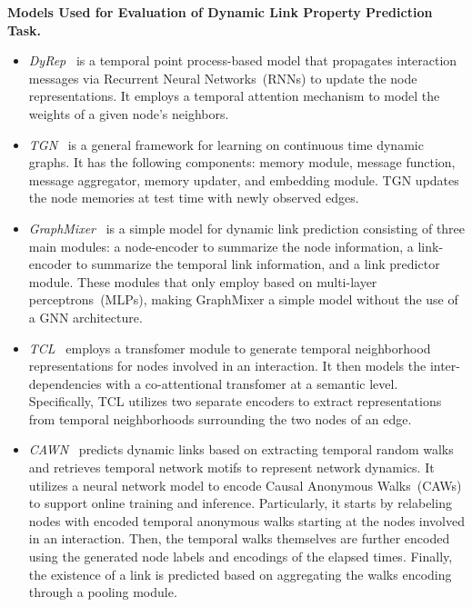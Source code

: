 \textbf{Models Used for Evaluation of Dynamic Link Property Prediction Task.}
\begin{itemize}[leftmargin=*]
    \item \emph{DyRep}~\cite{trivedi2019dyrep} is a temporal point process-based model that propagates interaction messages via Recurrent Neural Networks~(RNNs) to update the node representations. It employs a temporal attention mechanism to model the weights of a given node's neighbors. 
    
    \item \emph{TGN}~\cite{rossi2020temporal} is a general framework for learning on continuous time dynamic graphs. It has the following components: memory module, message function, message aggregator, memory updater, and embedding module. TGN updates the node memories at test time with newly observed edges. 
    
    \item \emph{GraphMixer}~\cite{congwe} is a simple model for dynamic link prediction consisting of three main modules: a node-encoder to summarize the node information, a link-encoder to summarize the temporal link information, and a link predictor module. These modules that only employ based on multi-layer perceptrons~(MLPs), making GraphMixer a simple model without the use of a GNN architecture.
    
    \item \emph{TCL}~\cite{wang2021tcl} employs a transfomer module to generate temporal neighborhood representations for nodes involved in an interaction. 
    It then models the inter-dependencies with a co-attentional transfomer at a semantic level. Specifically, TCL utilizes two separate encoders to extract representations from temporal neighborhoods surrounding the two nodes of an edge.
    
    \item \emph{CAWN}~\cite{wanginductive} predicts dynamic links based on extracting temporal random walks and retrieves temporal network motifs to represent network dynamics. It utilizes a neural network model to encode Causal Anonymous Walks~(CAWs) to support online training and inference.
    Particularly, it starts by relabeling nodes with encoded temporal anonymous walks starting at the nodes involved in an interaction.
    Then, the temporal walks themselves are further encoded using the generated node labels and encodings of the elapsed times.
    Finally, the existence of a link is predicted based on aggregating the walks encoding through a pooling module.


\end{itemize}
